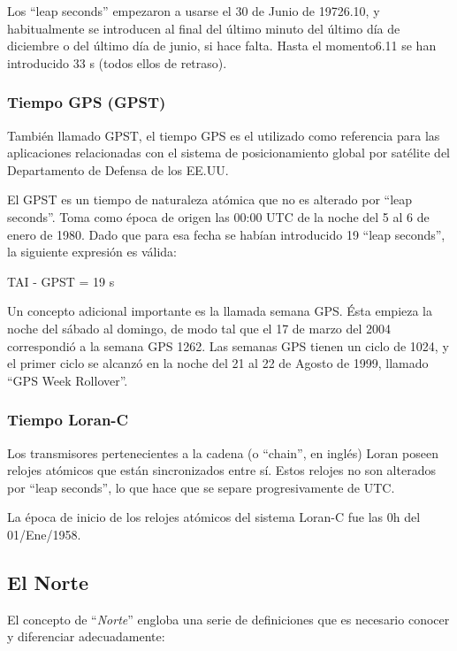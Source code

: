 Los ``leap seconds'' empezaron a usarse el 30 de Junio de 19726.10, y habitualmente se introducen al final del último minuto del último día de diciembre o del último día de junio, si hace falta. Hasta el momento6.11 se han introducido 33 s (todos ellos de retraso).

\subsubsection{Tiempo GPS (GPST)}
\label{sec:tiempo.gps}


También llamado GPST, el tiempo GPS es el utilizado como referencia para las aplicaciones relacionadas con el sistema de posicionamiento global por satélite del Departamento de Defensa de los EE.UU.

El GPST es un tiempo de naturaleza atómica que no es alterado por ``leap seconds''. Toma como época de origen las 00:00 UTC de la noche del 5 al 6 de enero de 1980. Dado que para esa fecha se habían introducido 19 ``leap seconds'', la siguiente expresión es válida:

TAI - GPST = 19 s

Un concepto adicional importante es la llamada semana GPS. Ésta empieza la noche del sábado al domingo, de modo tal que el 17 de marzo del 2004 correspondió a la semana GPS 1262. Las semanas GPS tienen un ciclo de 1024, y el primer ciclo se alcanzó en la noche del 21 al 22 de Agosto de 1999, llamado ``GPS Week Rollover''. 

\subsubsection{Tiempo Loran-C}
\label{sec:tiempo.loran.c}


Los transmisores pertenecientes a la cadena (o ``chain'', en inglés) Loran poseen relojes atómicos que están sincronizados entre sí. Estos relojes no son alterados por ``leap seconds'', lo que hace que se separe progresivamente de UTC.

La época de inicio de los relojes atómicos del sistema Loran-C fue las 0h del 01/Ene/1958.

\subsection{El Norte}
\label{sec:el.norte}
El concepto de ``\emph{Norte}'' engloba una serie de definiciones que es necesario conocer y diferenciar adecuadamente:


